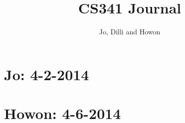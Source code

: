 


\author{Jo, Dilli and Howon}\title{CS341 Journal}\maketitle

\section*{Jo: 4-2-2014}


\section*{Howon: 4-6-2014}



